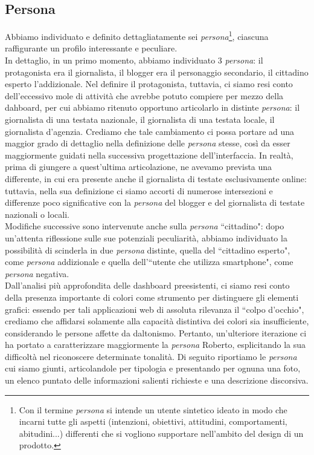 \subsection{Persona}
Abbiamo individuato e definito dettagliatamente sei \textit{persona}\footnote{Con il termine \textit{persona} si intende un utente sintetico ideato in modo che incarni tutte gli aspetti (intenzioni, obiettivi, attitudini, comportamenti, abitudini...) differenti che si vogliono supportare nell'ambito del design di un prodotto.}, ciascuna raffigurante un profilo interessante e peculiare.\\
In dettaglio, in un primo momento, abbiamo individuato 3 \textit{persona}: il protagonista era il giornalista, il blogger era il personaggio secondario, il cittadino esperto l'addizionale. Nel definire il protagonista, tuttavia, ci siamo resi conto dell'eccessivo mole di attività che avrebbe potuto compiere per mezzo della dahboard, per cui abbiamo ritenuto opportuno articolarlo in distinte \textit{persona}: il giornalista di una testata nazionale, il giornalista di una testata locale, il giornalista d'agenzia. Crediamo che tale cambiamento ci possa portare ad una maggior grado di dettaglio nella definizione delle \textit{persona} stesse, così da esser maggiormente guidati nella successiva progettazione dell'interfaccia.
\noindent
In realtà, prima di giungere a quest'ultima articolazione, ne avevamo prevista una differente, in cui era presente anche il giornalista di testate esclusivamente online: tuttavia, nella sua definizione ci siamo accorti di numerose intersezioni e differenze poco significative con la \textit{persona} del blogger e del giornalista di testate nazionali o locali. \\ 
Modifiche successive sono intervenute anche sulla \textit{persona} ``cittadino": dopo un'attenta riflessione sulle sue potenziali peculiarità, abbiamo individuato la possibilità di scinderla in due \textit{persona} distinte, quella del ``cittadino esperto", come \textit{persona} addizionale e quella dell'``utente che utilizza smartphone", come \textit{persona} negativa.\\
Dall'analisi più approfondita delle dashboard preesistenti, ci siamo resi conto della presenza importante di colori come strumento per distinguere gli elementi grafici: essendo per tali applicazioni web di assoluta rilevanza il ``colpo d'occhio", crediamo che affidarsi solamente alla capacità distintiva dei colori sia insufficiente, considerando le persone affette da daltonismo. Pertanto, un'ulteriore iterazione ci ha portato a caratterizzare maggiormente la \textit{persona} Roberto, esplicitando la sua difficoltà nel riconoscere determinate tonalità.
\noindent
Di seguito riportiamo le \textit{persona} cui siamo giunti, articolandole per tipologia e presentando per ognuna una foto, un elenco puntato delle informazioni salienti richieste e una descrizione discorsiva.
\newpage
